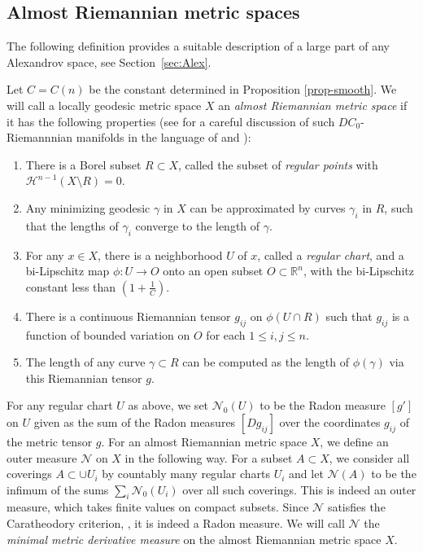 \documentclass[12pt,leqno,intlimits]{amsart}
\numberwithin{equation}{section}
\theoremstyle{definition}
\theoremstyle{remark}
\newcommand{\R}{\mathbb{R}}
\def\:{\colon}
\begin{document}

\subsection{Almost Riemannian metric spaces}
The following definition provides a suitable description of a large part of any Alexandrov space, see Section~\ref{sec:Alex}.

Let $C =C(n)$ be the constant determined in Proposition \ref{prop-smooth}.
We will call a locally geodesic metric space
$X$ an \emph{almost Riemannian metric space} if it has the following properties
(see \cite{AB15} for a careful discussion
of such $DC_0$-Riemannnian manifolds in the language of \cite{AB15} and \cite{Per-DC}):
\begin{enumerate}
\item There is a Borel subset $R\subset X$, called the subset of \emph{regular points} with $\mathcal H^{n-1} (X\setminus R)=0$.
\item Any minimizing geodesic $\gamma$ in $X$ can be approximated by curves $\gamma _i$ in $R$, such that the lengths of $\gamma _i$ converge to the length of $\gamma$.
\item For any $x\in X$, there is a neighborhood $U$ of $x$, called a \emph{regular chart}, and a bi-Lipschitz map
$\phi\:U\to O$ onto an open subset $O\subset \R^n$, with the bi-Lipschitz constant less than $(1+\frac 1 C)$.
\item There is a continuous Riemannian tensor $g_{ij} $ on $\phi (U\cap R)$ such that $g_{ij}$ is a function of bounded variation on $O$
for each $1\leq i,j \leq n$.
\item The length of any curve $\gamma \subset R$ can be computed as the length of $\phi (\gamma )$ via this Riemannian tensor $g$.
\end{enumerate}

For any regular chart $U$ as above, we set $\mathcal N_0 (U)$ to be the Radon measure $[g']$ on $U$ given as the sum of
the Radon measures $[D g_{ij}]$ over the coordinates $ g_{ij}$ of the metric tensor $g$.
For an almost Riemannian metric space $X$, we define an outer measure $\mathcal N$ on $X$ in the following way.
For a subset $A\subset X$, we consider all coverings $A\subset \cup U_i$ by countably many regular charts $U_i$ and let $\mathcal N(A)$
to be the infimum of the sums $\sum_i \mathcal N_0 (U_i)$ over all such coverings. This is indeed an outer measure, which takes finite values on compact subsets. Since $\mathcal N$ satisfies the Caratheodory criterion, \cite[Theorem 1.9]{Evans}, it is indeed a Radon measure. We will call $\mathcal N$ the \emph{minimal metric derivative measure} on the almost Riemannian metric space $X$.
\end{document}
